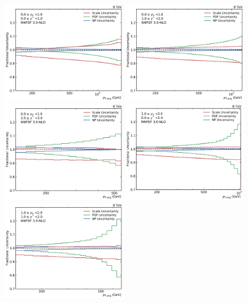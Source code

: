 \begin{figure}[htp]
    \centering
    \includegraphics[width=0.47\textwidth]{figures/theory/theo_unc_yb0ys0.pdf}\hfill
    \includegraphics[width=0.47\textwidth]{figures/theory/theo_unc_yb0ys1.pdf}
    \includegraphics[width=0.47\textwidth]{figures/theory/theo_unc_yb0ys2.pdf}\hfill
    \includegraphics[width=0.47\textwidth]{figures/theory/theo_unc_yb1ys0.pdf}
    \includegraphics[width=0.47\textwidth]{figures/theory/theo_unc_yb1ys1.pdf}\hfill

\end{figure}
